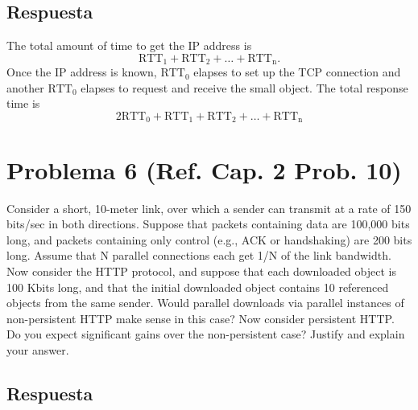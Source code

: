\documentclass[10pt,spanish]{article}
\numberwithin{figure}{section} %
\begin{document}
\subsection*{Respuesta}

The total amount of time to get the IP address is\\
\begin{equation*}\mathrm{RTT_1 + RTT_2 + \ldots + RTT_n}.\end{equation*}
Once the IP address is known, $\mathrm{RTT_0}$ elapses to set up the TCP connection and another $\mathrm{RTT_0}$ elapses to request and receive the small object. The total response time is
\begin{equation*}\mathrm{2RTT_0 + RTT_1 + RTT_2 + \ldots + RTT_n}\end{equation*}

\section[Problema 6]{Problema 6 \textnormal{\Large{(Ref. Cap. 2 Prob. 10)}}}

Consider a short, 10-meter link, over which a sender can transmit at a rate of 150 bits/sec in both directions. Suppose that packets containing data are 100,000 bits long, and packets containing only control (e.g., ACK or handshaking) are 200 bits long. Assume that N parallel connections each get 1/N of the link bandwidth. Now consider the HTTP protocol, and suppose that each downloaded object is 100 Kbits long, and that the initial downloaded object contains 10 referenced objects from the same sender. Would parallel downloads via parallel instances of non-persistent HTTP make sense in this case? Now consider persistent HTTP. Do you expect significant gains over the non-persistent case? Justify and explain your answer.

\subsection*{Respuesta}
\end{document}
